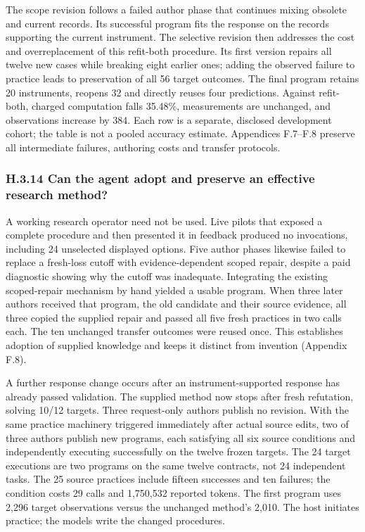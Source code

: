 \documentclass[11pt,a4paper]{article}
\begin{document}
The scope revision follows a failed author phase that continues mixing obsolete
and current records. Its successful program fits the response on the records
supporting the current instrument. The selective revision then addresses the
cost and overreplacement of this refit-both procedure. Its first version repairs
all twelve new cases while breaking eight earlier ones; adding the observed
failure to practice leads to preservation of all 56 target outcomes. The final
program retains 20 instruments, reopens 32 and directly reuses four predictions.
Against refit-both, charged computation falls 35.48\%, measurements are unchanged,
and observations increase by 384. Each row is a separate, disclosed development
cohort; the table is not a pooled accuracy estimate. Appendices F.7–F.8 preserve
all intermediate failures, authoring costs and transfer protocols.


\subsubsection*{H.3.14 Can the agent adopt and preserve an effective research method?}

A working research operator need not be used. Live pilots that exposed a complete
procedure and then presented it in feedback produced no invocations, including
24 unselected displayed options. Five author phases likewise failed to replace a
fresh-loss cutoff with evidence-dependent scoped repair, despite a paid diagnostic
showing why the cutoff was inadequate. Integrating the existing scoped-repair
mechanism by hand yielded a usable program. When three later authors received
that program, the old candidate and their source evidence, all three copied the
supplied repair and passed all five fresh practices in two calls each. The ten
unchanged transfer outcomes were reused once. This establishes adoption of
supplied knowledge and keeps it distinct from invention (Appendix F.8).


A further response change occurs after an instrument-supported response has
already passed validation. The supplied method now stops after fresh refutation,
solving 10/12 targets. Three request-only authors publish no revision. With the
same practice machinery triggered immediately after actual source edits, two of
three authors publish new programs, each satisfying all six source conditions
and independently executing successfully on the twelve frozen targets. The 24
target executions are two programs on the same twelve contracts, not 24 independent
tasks. The 25 source practices include fifteen successes and ten failures; the
condition costs 29 calls and 1,750,532 reported tokens. The first program uses
2,296 target observations versus the unchanged method's 2,010. The host initiates
practice; the models write the changed procedures.
\end{document}
